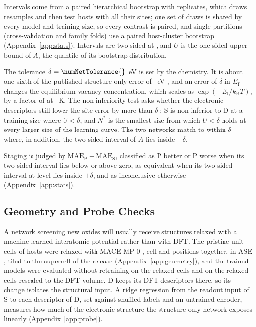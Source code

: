 Intervals come from a paired hierarchical bootstrap \citep{Efron1979bootstrap,Efron1993introduction} with \numCfgAnalysisBootstrapDraws{} replicates, which draws resamples and then test hosts with all their sites; one set of draws is shared by every model and training size, so every contrast is paired, and single partitions (cross-validation and family folds) use a paired host-cluster bootstrap (Appendix~\ref{app:stats}). Intervals are two-sided at \pctci{}, and $U$ is the one-sided upper bound of $A$, the \numCfgAnalysisNStarUpperQuantile{} quantile of its bootstrap distribution.

The tolerance $\delta = \numNetTolerance{}$~eV is set by the chemistry. It is about one-sixth of the published structure-only error of \numNetPublishedMae{}~eV \citep{Kiyohara2025machinelearning}, and an error of $\delta$ in $E_\mathrm{f}$ changes the equilibrium vacancy concentration, which scales as $\exp(-E_\mathrm{f}/k_\mathrm{B}T)$, by a factor of \numNetIllusTolFactor{} at \numNetIllusTemperature{}~K. The non-inferiority test asks whether the electronic descriptors still lower the site error by more than $\delta$ \citep{Schuirmann1987comparison,Lakens2017equivalence}: S is non-inferior to D at a training size where $U < \delta$, and $N^{*}$ is the smallest size from which $U < \delta$ holds at every larger size of the learning curve. The two networks match to within $\delta$ where, in addition, the two-sided interval of $A$ lies inside $\pm\delta$.

Staging is judged by $\mathrm{MAE}_\mathrm{P} - \mathrm{MAE}_\mathrm{S}$, classified as P better or P worse when its two-sided interval lies below or above zero, as equivalent when its two-sided interval at level \numCfgAnalysisEquivalenceTostCi{} lies inside $\pm\delta$, and as inconclusive otherwise (Appendix~\ref{app:stats}).

\subsection{Geometry and Probe Checks}
\label{sec:checks}

A network screening new oxides will usually receive structures relaxed with a machine-learned interatomic potential rather than with DFT. The pristine unit cells of \numNetGeomRelaxedHosts{} hosts were relaxed with MACE-MP-0 \citep{Batatia2025foundation}, cell and positions together, in ASE \citep{HjorthLarsen2017atomic}, tiled to the supercell of the release (Appendix~\ref{app:geometry}), and the trained models were evaluated without retraining on the relaxed cells and on the relaxed cells rescaled to the DFT volume. D keeps its DFT descriptors there, so its change isolates the structural input. A ridge regression from the readout input of S to each descriptor of D, set against shuffled labels and an untrained encoder, measures how much of the electronic structure the structure-only network exposes linearly \citep{Alain2018understanding} (Appendix~\ref{app:probe}).

